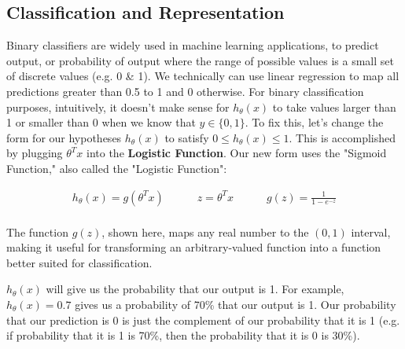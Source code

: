 \documentclass{article}
\begin{document}
        \subsection{Classification and Representation}
            Binary classifiers are widely used in machine learning applications, to predict output, or probability of output where the 
            range of possible values is a small set of discrete values (e.g. 0 \& 1). We technically can use linear regression
            to map all predictions greater than 0.5 to 1 and 0 otherwise. For binary classification purposes, intuitively, it doesn’t make sense for $h_\theta(x)$
            to take values larger than 1 or smaller than 0 when we know that $y \in \{0, 1\}$.  To fix this, let’s change the form 
            for our hypotheses $h_\theta(x)$ to satisfy $0 \leq h_\theta (x) \leq 1$. This is accomplished by plugging $\theta^Tx$ into the \textbf{Logistic Function}.
            Our new form uses the "Sigmoid Function," also called the "Logistic Function":

            \vspace{-6pt}

            \begin{align*}
                h_{\theta}(x) = g(\theta^Tx) \hspace{3em} z = \theta^Tx \hspace{3em} g(z) = \frac{1}{1-e^{-z}} \\
            \end{align*}

            \begin{center}
            \end{center}

            The function $g(z)$, shown here, maps any real number to the $(0, 1)$ interval, making it useful for transforming an 
            arbitrary-valued function into a function better suited for classification.

            $h_\theta(x)$ will give us the probability that our output is 1. For example, $h_\theta(x) = 0.7$
            gives us a probability of 70\% that our output is 1. Our probability that our prediction is 0 is just the complement of 
            our probability that it is 1 (e.g. if probability that it is 1 is 70\%, then the probability that it is 0 is 30\%).
\end{document}
